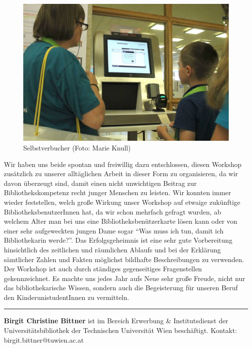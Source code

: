 \documentclass[a4paper,
fontsize=11pt,
oneside,
numbers=noperiodatend,
parskip=half-,
bibliography=totoc,
final
]{scrartcl}
\begin{document}
\begin{figure}
\centering
\includegraphics{img/image_6.jpg}
\caption{Selbstverbucher (Foto: Marie Knull)}
\end{figure}

Wir haben uns beide spontan und freiwillig dazu entschlossen, diesen
Workshop zusätzlich zu unserer alltäglichen Arbeit in dieser Form zu
organisieren, da wir davon überzeugt sind, damit einen nicht unwichtigen
Beitrag zur Bibliothekskompetenz recht junger Menschen zu leisten. Wir
konnten immer wieder feststellen, welch große Wirkung unser Workshop auf
etwaige zukünftige BibliotheksbenutzerInnen hat, da wir schon mehrfach
gefragt wurden, ab welchem Alter man bei uns eine
Bibliotheksbenützerkarte lösen kann oder von einer sehr aufgeweckten
jungen Dame sogar \enquote{Was muss ich tun, damit ich Bibliothekarin
werde?}. Das Erfolgsgeheimnis ist eine sehr gute Vorbereitung
hinsichtlich des zeitlichen und räumlichen Ablaufs und bei der Erklärung
sämtlicher Zahlen und Fakten möglichst bildhafte Beschreibungen zu
verwenden. Der Workshop ist auch durch ständiges gegenseitiges
Fragenstellen gekennzeichnet. Es machte uns jedes Jahr aufs Neue sehr
große Freude, nicht nur das bibliothekarische Wissen, sondern auch die
Begeisterung für unseren Beruf den KinderunistudentInnen zu vermitteln.

\begin{center}\rule{0.5\linewidth}{\linethickness}\end{center}

\textbf{Birgit Christine Bittner} ist im Bereich Erwerbung \&
Institutsdienst der Universitätsbibliothek der Technischen Universität
Wien beschäftigt. Kontakt: birgit.bittner@tuwien.ac.at
\end{document}
